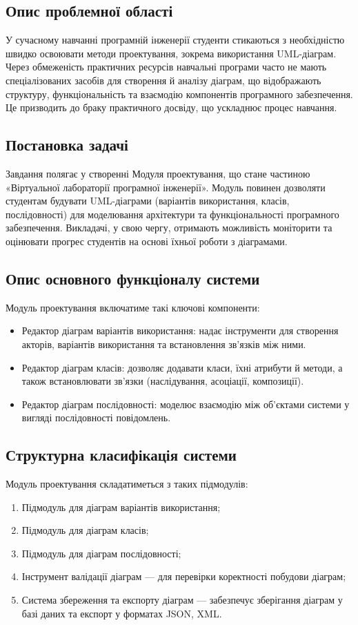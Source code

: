 \documentclass[oneside,14pt]{extarticle}
\begin{document}
\begin{normalsize}
	\subsection{Опис проблемної області}
	У сучасному навчанні програмній інженерії студенти стикаються з необхідністю швидко освоювати методи проектування, зокрема використання UML-діаграм. Через обмеженість практичних ресурсів навчальні програми часто не мають спеціалізованих засобів для створення й аналізу діаграм, що відображають структуру, функціональність та взаємодію компонентів програмного забезпечення. Це призводить до браку практичного досвіду, що ускладнює процес навчання.
	
	\subsection{Постановка задачі}
	Завдання полягає у створенні Модуля проектування, що стане частиною «Віртуальної лабораторії програмної інженерії». Модуль повинен дозволяти студентам будувати UML-діаграми (варіантів використання, класів, послідовності) для моделювання архітектури та функціональності програмного забезпечення. Викладачі, у свою чергу, отримають можливість моніторити та оцінювати прогрес студентів на основі їхньої роботи з діаграмами.
	
	\subsection{Опис основного функціоналу системи}
	Модуль проектування включатиме такі ключові компоненти:
	\begin{itemize}
		\item Редактор діаграм варіантів використання: надає інструменти для створення акторів, варіантів використання та встановлення зв’язків між ними.
		\item Редактор діаграм класів: дозволяє додавати класи, їхні атрибути й методи, а також встановлювати зв’язки (наслідування, асоціації, композиції).
		\item Редактор діаграм послідовності: моделює взаємодію між об'єктами системи у вигляді послідовності повідомлень.
	\end{itemize}
	
	\subsection{Структурна класифікація системи}
	Модуль проектування складатиметься з таких підмодулів:
	\begin{enumerate}
		\item Підмодуль для діаграм варіантів використання;
		\item Підмодуль для діаграм класів;
		\item Підмодуль для діаграм послідовності;
		\item Інструмент валідації діаграм — для перевірки коректності побудови діаграм;
		\item Система збереження та експорту діаграм — забезпечує зберігання діаграм у базі даних та експорт у форматах JSON, XML.
	\end{enumerate}
	

\end{normalsize}
\end{document}
